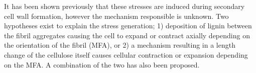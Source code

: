 It has been shown previously that these stresses are induced during secondary
cell wall formation, however the mechanism responsible is unknown. Two
hypotheses exist to explain the stress generation; 1) deposition of lignin
between the fibril aggregates causing the cell to expand or contract axially
depending on the orientation of the fibril (MFA), or 2) a mechanism resulting in
a length change of the cellulose itself causes cellular contraction or expansion
depending on the MFA. A combination of the two has also been proposed.